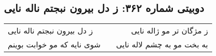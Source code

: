 \begin{center}
\section*{دوبیتی شماره ۳۶۲: ز دل بیرون نبجتم ناله نایی}
\label{sec:362}
\begin{longtable}{l p{0.5cm} r}
ز دل بیرون نبجتم ناله نایی
&&
ز مژگان تر مو ژاله نایی
\\
شوی نایه که مو خوابت بوینم
&&
به بخت مو به چشم لاله نایی
\\
\end{longtable}
\end{center}
